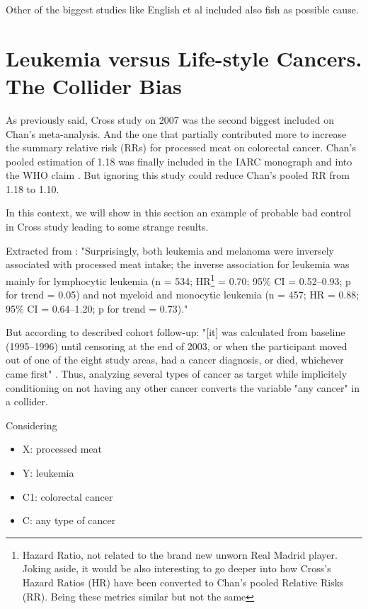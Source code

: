 \documentclass{article}
\begin{document}
Other of the biggest studies like English et al \cite{english} included also fish as possible cause.

\section{Leukemia versus Life-style Cancers. The Collider Bias}
\label{sec:cross}
As previously said, Cross study on 2007 \cite{cross} was the second biggest included on Chan's meta-analysis. And the one that partially contributed more to increase the summary relative risk (RRs) for processed meat on colorectal cancer. Chan's pooled estimation of 1.18 was finally included in the IARC monograph \cite{monograph} and into the WHO claim \cite{whoint}. But ignoring this study could reduce Chan's pooled RR from 1.18 to 1.10.

In this context, we will show in this section an example of probable bad control in Cross study leading to some strange results.

Extracted from \cite{cross}: "Surprisingly, both leukemia and melanoma were inversely associated with processed meat intake; the inverse association for leukemia was mainly for lymphocytic leukemia (n = 534; HR\footnote{Hazard Ratio, not related to the brand new unworn Real Madrid player. Joking aside, it would be also interesting to go deeper into how Cross's Hazard Ratios (HR) have been converted to Chan's pooled Relative Risks (RR). Being these metrics similar but not the same} = 0.70; 95\% CI = 0.52–0.93; p for trend = 0.05) and not myeloid and monocytic leukemia (n = 457; HR = 0.88; 95\% CI = 0.64–1.20; p for trend = 0.73)."

But according to described cohort follow-up: "[it] was calculated from baseline (1995–1996) until censoring at the end of 2003, or when the participant moved out of one of the eight study areas, had a cancer diagnosis, or died, whichever came first" \cite{cross}. Thus, analyzing several types of cancer as target while implicitely conditioning on not having any other cancer converts the variable "any cancer" in a collider.

Considering
\begin{itemize}
\item X: processed meat
\item Y: leukemia
\item C1: colorectal cancer
\item C: any type of cancer
\end{itemize}
\end{document}
